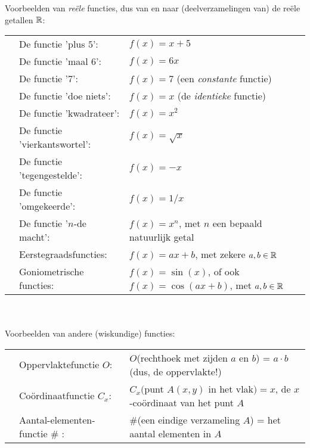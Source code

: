 \documentclass{ximera}
\begin{document}
Voorbeelden van \textit{reële} functies, dus van en naar (deelverzamelingen van) de reële getallen $\mathbb{R}$:
\\
\begin{tabular}[t]{l l l}
    & De functie 'plus $5$':       & $f(x) = x + 5$ \\
    & De functie 'maal 6':         & $f(x) = 6x$ \\
    & De functie '7':              & $f(x) = 7$  (een \textit{constante} functie) \\
    & De functie 'doe niets':      & $f(x) = x$  (de \textit{identieke} functie) \\
    & De functie 'kwadrateer':     & $f(x) = x^2$ \\
    & De functie 'vierkantswortel':& $f(x) = \sqrt{x}$ \\   
    & De functie 'tegengestelde':  & $f(x) = -x$ \\
    & De functie 'omgekeerde':     & $f(x) = 1/x$ \\
    & De functie '$n$-de macht':   & $f(x) = x^n$, met $n$ een bepaald %
     natuurlijk getal \\
	& Eerstegraadsfuncties:        & $f(x) = ax + b$, met zekere $a,b \in \mathbb{R}$  \\
	& Goniometrische functies:     & $f(x) = \sin(x)$, of ook $f(x)=\cos(ax+b)$, met $a,b \in \mathbb{R}$     \\
\end{tabular}
\\
\\
Voorbeelden van andere (wiskundige) functies:
\\
\begin{tabular}[t]{l l l}
	& Oppervlaktefunctie $O$:    & $O$(rechthoek met zijden $a$ en $b$) = $a\cdot b$ (dus, de oppervlakte!) \\
	& Coördinaatfunctie $C_x$\footnotemark[3]:     & $C_x($punt $A(x,y) $ in het vlak$) = x$, de $x$-coördinaat van het punt $A$  \\
    & Aantal-elementen-functie \# \footnotemark[4]: & \#(een eindige verzameling $A$) = het aantal elementen in $A$
\end{tabular}
\end{document}
